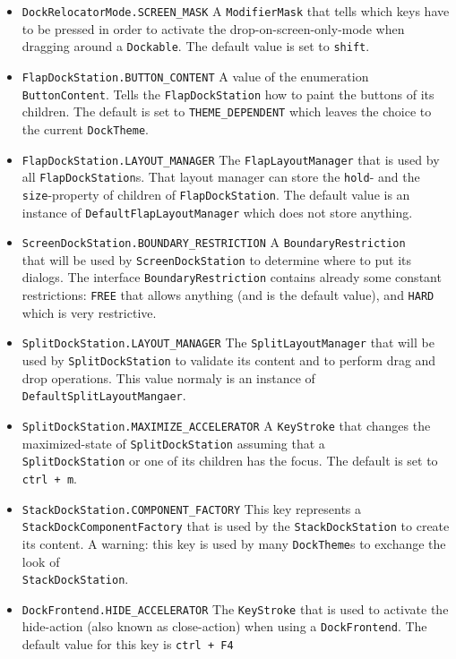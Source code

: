 \documentclass[a4paper,10pt]{article}
\newcommand{\src}[1]{\lstinline[basicstyle=\normalsize\ttfamily,keywordstyle=\normalsize\ttfamily,identifierstyle=\normalsize\ttfamily]|#1|}
\begin{document}
\begin{itemize}
\item \src{DockRelocatorMode.SCREEN_MASK} A \src{ModifierMask} that tells which keys have to be pressed in order to activate the drop-on-screen-only-mode when dragging around a \src{Dockable}. The default value is set to \src{shift}.
\item \src{FlapDockStation.BUTTON_CONTENT} A value of the enumeration \\\src{ButtonContent}. Tells the \src{FlapDockStation} how to paint the buttons of its children. The default is set to \src{THEME_DEPENDENT} which leaves the choice to the current \src{DockTheme}.
\item \src{FlapDockStation.LAYOUT_MANAGER} The \src{FlapLayoutManager} that is used by all \src{FlapDockStation}s. That layout manager can store the \src{hold}- and the \src{size}-property of children of \src{FlapDockStation}. The default value is an instance of \src{DefaultFlapLayoutManager} which does not store anything.
\item \src{ScreenDockStation.BOUNDARY_RESTRICTION} A \src{BoundaryRestriction} \\that will be used by \src{ScreenDockStation} to determine where to put its dialogs. The interface \src{BoundaryRestriction} contains already some constant restrictions: \src{FREE} that allows anything (and is the default value), and \src{HARD} which is very restrictive.
\item \src{SplitDockStation.LAYOUT_MANAGER} The \src{SplitLayoutManager} that will be used by \src{SplitDockStation} to validate its content and to perform drag and drop operations. This value normaly is an instance of \\\src{DefaultSplitLayoutMangaer}. 
\item \src{SplitDockStation.MAXIMIZE_ACCELERATOR} A \src{KeyStroke} that changes the maximized-state of \src{SplitDockStation} assuming that a \\\src{SplitDockStation} or one of its children has the focus. The default is set to \src{ctrl + m}.
\item \src{StackDockStation.COMPONENT_FACTORY} This key represents a \\\src{StackDockComponentFactory} that is used by the \src{StackDockStation} to create its content. A warning: this key is used by many \src{DockTheme}s to exchange the look of \\\src{StackDockStation}.
\item \src{DockFrontend.HIDE_ACCELERATOR} The \src{KeyStroke} that is used to activate the hide-action (also known as close-action) when using a \src{DockFrontend}. The default value for this key is \src{ctrl + F4}
\end{itemize}
\end{document}
